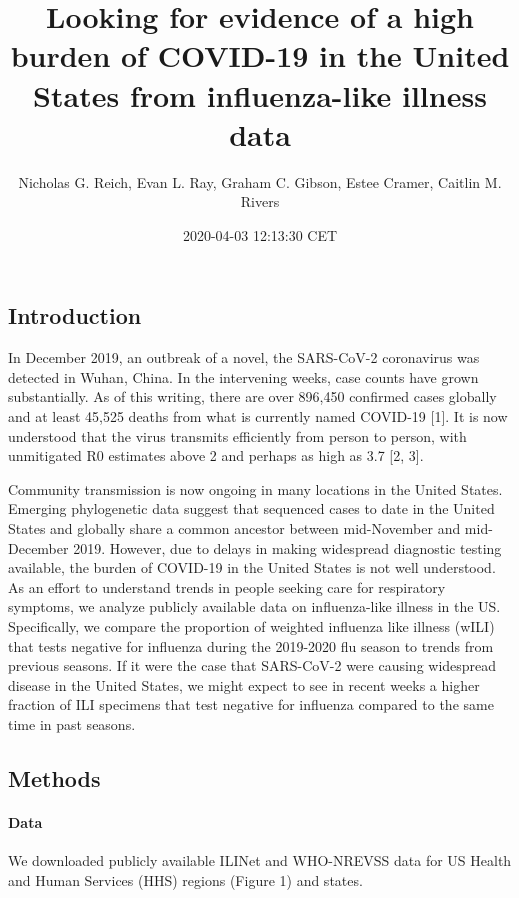 \documentclass[]{article}
\title{Looking for evidence of a high burden of COVID-19 in the United States
from influenza-like illness data}
\author{Nicholas G. Reich, Evan L. Ray, Graham C. Gibson, Estee Cramer, Caitlin
M. Rivers}
\date{2020-04-03 12:13:30 CET}
\let\oldparagraph\paragraph
\renewcommand{\paragraph}[1]{\oldparagraph{#1}\mbox{}}
\begin{document}
\maketitle

\hypertarget{introduction}{%
\subsection{Introduction}\label{introduction}}

In December 2019, an outbreak of a novel, the SARS-CoV-2 coronavirus was
detected in Wuhan, China. In the intervening weeks, case counts have
grown substantially. As of this writing, there are over 896,450
confirmed cases globally and at least 45,525 deaths from what is
currently named COVID-19 {[}1{]}. It is now understood that the virus
transmits efficiently from person to person, with unmitigated R0
estimates above 2 and perhaps as high as 3.7 {[}2, 3{]}.

Community transmission is now ongoing in many locations in the United
States. Emerging phylogenetic data suggest that sequenced cases to date
in the United States and globally share a common ancestor between
mid-November and mid-December 2019. However, due to delays in making
widespread diagnostic testing available, the burden of COVID-19 in the
United States is not well understood. As an effort to understand trends
in people seeking care for respiratory symptoms, we analyze publicly
available data on influenza-like illness in the US. Specifically, we
compare the proportion of weighted influenza like illness (wILI) that
tests negative for influenza during the 2019-2020 flu season to trends
from previous seasons. If it were the case that SARS-CoV-2 were causing
widespread disease in the United States, we might expect to see in
recent weeks a higher fraction of ILI specimens that test negative for
influenza compared to the same time in past seasons.

\hypertarget{methods}{%
\subsection{Methods}\label{methods}}

\hypertarget{data}{%
\paragraph{Data}\label{data}}

We downloaded publicly available ILINet and WHO-NREVSS data for US
Health and Human Services (HHS) regions (Figure 1) and states.
\end{document}
